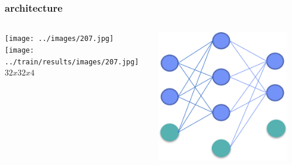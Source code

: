 \documentclass{beamer}
\begin{document}
\begin{frame}
\frametitle{architecture}
\begin{columns}
\begin{column}{.01\textwidth}
\texttt{[image: ../images/207.jpg]}\\
\texttt{[image: ../train/results/images/207.jpg]}\\
$32x32x4$
\end{column}
\begin{column}{.4\textwidth}
\includegraphics[width=1.3\linewidth]{mp1.png}
\end{column}
\begin{column}{.14\textwidth}

\end{column}
\end{columns}
\end{frame}
\end{document}
